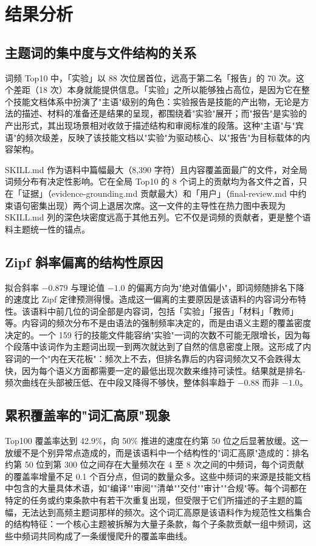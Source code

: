 \documentclass[12pt,a4paper]{ctexart}
\begin{document}
\section{结果分析}

\subsection{主题词的集中度与文件结构的关系}

词频 Top10 中，「实验」以 88 次位居首位，远高于第二名「报告」的 70 次。这个差距（18 次）本身就能提供信息。「实验」之所以能够独占高位，是因为它在整个技能文档体系中扮演了"主语"级别的角色：实验报告是技能的产出物，无论是方法的描述、材料的准备还是结果的呈现，都围绕着"实验"展开；而"报告"是实验的产出形式，其出现场景相对收敛于描述结构和审阅标准的段落。这种"主语"与"宾语"的频次级差，反映了该技能文档以"实验"为驱动核心、以"报告"为目标载体的内容架构。

SKILL.md 作为语料中篇幅最大（8,390 字符）且内容覆盖面最广的文件，对全局词频分布有决定性影响。它在全局 Top10 的 8 个词上的贡献均为各文件之首，只在「证据」（evidence-grounding.md 贡献最大）和「用户」（final-review.md 中约束语句密集出现）两个词上退居次席。这一文件的主导性在热力图中表现为 SKILL.md 列的深色块密度远高于其他五列。它不仅是词频的贡献者，更是整个语料主题统一性的锚点。

\subsection{Zipf 斜率偏离的结构性原因}

拟合斜率 \(-0.879\) 与理论值 \(-1.0\) 的偏离方向为"绝对值偏小"，即词频随排名下降的速度比 Zipf 定律预测得慢。造成这一偏离的主要原因是该语料的内容词分布特性。该语料中前几位的词全部是内容词，包括「实验」「报告」「材料」「教师」等。内容词的频次分布不是由语法的强制频率决定的，而是由语义主题的覆盖密度决定的。一个 159 行的技能文件能容纳"实验"一词的次数不可能无限增长，因为每个段落中该词作为主题词出现一到两次就达到了自然的信息密度上限。这形成了内容词的一个"内在天花板"：频次上不去，但排名靠后的内容词频次又不会跌得太快，因为每个语义方面都需要一定的最低出现次数来维持可读性。结果就是排名-频次曲线在头部被压低、在中段又降得不够快，整体斜率趋于 \(-0.88\) 而非 \(-1.0\)。

\subsection{累积覆盖率的"词汇高原"现象}

Top100 覆盖率达到 42.9\%，向 50\% 推进的速度在约第 50 位之后显著放缓。这一放缓不是个别异常点造成的，而是该语料中一个结构性的"词汇高原"造成的：排名约第 50 位到第 300 位之间存在大量频次在 4 至 8 次之间的中频词，每个词贡献的覆盖率增量不足 0.1 个百分点，但词的数量众多。这些中频词的来源是技能文档中包含的大量具体术语，如"编译""审阅""清单""交付""审计""合规"等。每个词都在特定的任务或约束条款中有若干次重复出现，但受限于它们所描述的子主题的篇幅，无法达到高频主题词那样的频次。这个词汇高原是该语料作为规范性文档集合的结构特征：一个核心主题被拆解为大量子条款，每个子条款贡献一组中频词，这些中频词共同构成了一条缓慢爬升的覆盖率曲线。
\end{document}
